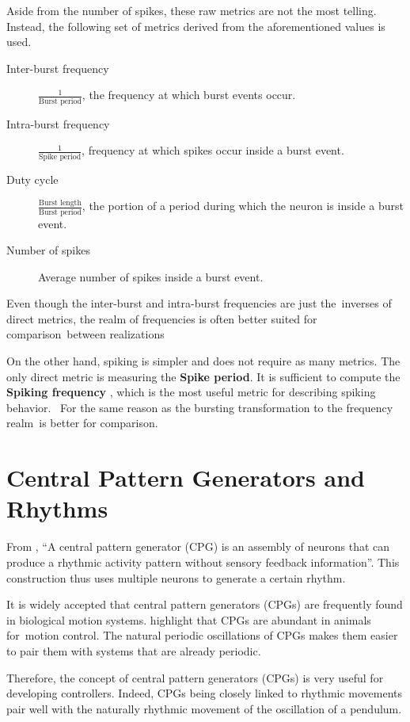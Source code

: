 Aside from the number of spikes, these raw metrics are not the most telling.
Instead, the following set of metrics derived from the aforementioned values is used.
\begin{description}
    \item[Inter-burst frequency] $\frac{1}{\text{Burst period}}$, the frequency at which burst events occur.
    \item[Intra-burst frequency] $\frac{1}{\text{Spike period}}$, frequency at which spikes occur inside a burst event.
    \item[Duty cycle] $\frac{\text{Burst length}}{\text{Burst period}}$, the portion of a period during which the neuron is inside a burst event.
    \item[Number of spikes] Average number of spikes inside a burst event.
\end{description}
Even though the inter-burst and intra-burst frequencies are just the inverses of direct metrics, the realm of frequencies is often better suited for comparison between realizations

On the other hand, spiking is simpler and does not require as many metrics.
The only direct metric is measuring the \textbf{Spike period}.
It is sufficient to compute the \textbf{Spiking frequency} , which is the most useful metric for describing spiking behavior. 
For the same reason as the bursting transformation to the frequency realm is better for comparison.

\section{Central Pattern Generators and Rhythms}

From \citet{cpgDef}, \enquote{A central pattern generator (CPG) is an assembly of neurons that can produce a rhythmic activity pattern without  sensory feedback information}.
This construction thus uses multiple neurons to generate a certain rhythm.

It is widely accepted that central pattern generators (CPGs) are frequently found in biological motion systems.
\citet{cpgMotion, cpgMotion2} highlight that CPGs are abundant in animals for motion control.
The natural periodic oscillations of CPGs makes them easier to pair them with systems that are already periodic.

Therefore, the concept of central pattern generators (CPGs) is very useful for developing controllers.
Indeed, CPGs being closely linked to rhythmic movements pair well with the naturally rhythmic movement of the oscillation of a pendulum.

